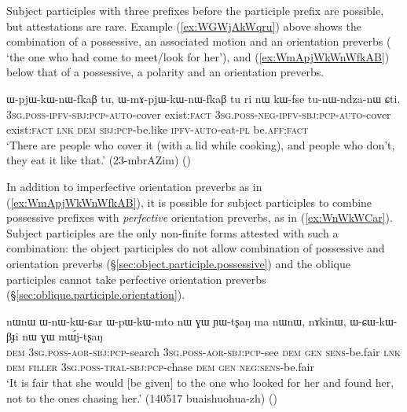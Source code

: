 Subject participles with three prefixes before the participle prefix  are possible, but attestations are rare. Example (\ref{ex:WGWjAkWqru}) above shows the combination of a possessive, an associated motion and an orientation preverbs ( `the one who had come to meet/look for her'), and (\ref{ex:WmApjWkWnWfkAB}) below that of a possessive, a polarity and an orientation preverbs.

\begin{exe}
\ex \label{ex:WmApjWkWnWfkAB}
 \gll ɯ-pjɯ-kɯ-nɯ-fkaβ tu, ɯ-mɤ-pjɯ-kɯ-nɯ-fkaβ tu ri nɯ kɯ-fse tu-nɯ-ndza-nɯ ɕti. \\
 \textsc{3sg}.\textsc{poss}-\textsc{ipfv}-\textsc{sbj}:\textsc{pcp}-\textsc{auto}-cover exist:\textsc{fact}  \textsc{3sg}.\textsc{poss}-\textsc{neg}-\textsc{ipfv}-\textsc{sbj}:\textsc{pcp}-\textsc{auto}-cover exist:\textsc{fact} \textsc{lnk} \textsc{dem} \textsc{sbj}:\textsc{pcp}-be.like \textsc{ipfv}-\textsc{auto}-eat-\textsc{pl} be.\textsc{aff}:\textsc{fact} \\
 \glt `There are people who cover it (with a lid while cooking), and people who don't, they eat it like that.' (23-mbrAZim)
()
\end{exe}

In addition to imperfective orientation preverbs as in (\ref{ex:WmApjWkWnWfkAB}), it is possible for subject participles to combine possessive prefixes with \textit{perfective} orientation preverbs, as in (\ref{ex:WnWkWCar}). Subject participles are the only non-finite forms attested with such a combination: the object participles do not allow combination of possessive and orientation preverbs (§\ref{sec:object.participle.possessive}) and the oblique participles cannot take perfective orientation preverbs (§\ref{sec:oblique.participle.orientation}).

 \begin{exe} 
\ex \label{ex:WnWkWCar}
\gll nɯnɯ ɯ-nɯ-kɯ-ɕar ɯ-pɯ-kɯ-mto nɯ ɣɯ ɲɯ-tʂaŋ ma nɯnɯ, nɤkinɯ, ɯ-ɕɯ-kɯ-βɟi nɯ ɣɯ mɯ́j-tʂaŋ \\
\textsc{dem} \textsc{3sg}.\textsc{poss}-\textsc{aor}-\textsc{sbj}:\textsc{pcp}-search \textsc{3sg}.\textsc{poss}-\textsc{aor}-\textsc{sbj}:\textsc{pcp}-see \textsc{dem} \textsc{gen} \textsc{sens}-be.fair \textsc{lnk} \textsc{dem} \textsc{filler} \textsc{3sg}.\textsc{poss}-\textsc{tral}-\textsc{sbj}:\textsc{pcp}-chase \textsc{dem} \textsc{gen} \textsc{neg}:\textsc{sens}-be.fair \\
\glt `It is fair that she would [be given] to the one who looked for her and found her, not to the ones chasing her.' (140517 buaishuohua-zh)
()
\end{exe}

